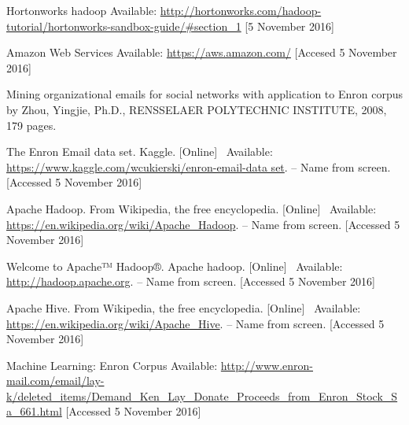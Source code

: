 \documentclass{llncs}
\begin{document}
\newpage
%
\begin{thebibliography}{5}
%
Hortonworks hadoop
Available: \url{http://hortonworks.com/hadoop-tutorial/hortonworks-sandbox-guide/#section_1}
[5 November 2016]

Amazon Web Services
Available: \url{https://aws.amazon.com/}
[Accesed 5 November 2016]

Mining organizational emails for social networks with application to Enron corpus by Zhou, Yingjie, Ph.D., RENSSELAER POLYTECHNIC INSTITUTE, 2008, 179 pages.

The Enron Email data set. Kaggle. [Online] \
Available: \url{https://www.kaggle.com/wcukierski/enron-email-data set}. –
Name from screen. [Accessed 5 November 2016]

Apache Hadoop. From Wikipedia, the free encyclopedia. [Online] \
Available: \url{https://en.wikipedia.org/wiki/Apache_Hadoop}. –
Name from screen. [Accessed 5 November 2016]

Welcome to Apache™ Hadoop®. Apache hadoop. [Online] \
Available: \url{http://hadoop.apache.org}. –
Name from screen. [Accessed 5 November 2016]

\bibitem{hive wikipedia}
Apache Hive. From Wikipedia, the free encyclopedia. [Online] \
Available: \url{https://en.wikipedia.org/wiki/Apache_Hive}. –
Name from screen. [Accessed 5 November 2016]

\bibitem{demankeylay}
Machine Learning: Enron Corpus
Available: \url{http://www.enron-mail.com/email/lay-k/deleted_items/Demand_Ken_Lay_Donate_Proceeds_from_Enron_Stock_Sa_661.html}
[Accessed 5 November 2016]

\end{thebibliography}
\end{document}
